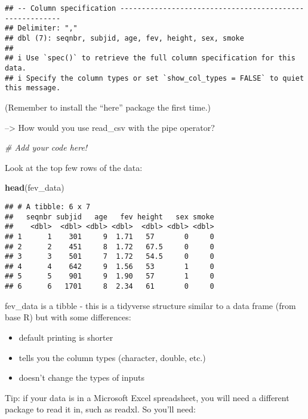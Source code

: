 \documentclass[
]{article}
\newenvironment{Shaded}{\begin{snugshade}}{\end{snugshade}}
\newcommand{\CommentTok}[1]{\textcolor[rgb]{0.56,0.35,0.01}{\textit{#1}}}
\newcommand{\FunctionTok}[1]{\textcolor[rgb]{0.13,0.29,0.53}{\textbf{#1}}}
\newcommand{\NormalTok}[1]{#1}
\providecommand{\tightlist}{%
  \setlength{\itemsep}{0pt}\setlength{\parskip}{0pt}}
\begin{document}
\begin{verbatim}
## -- Column specification --------------------------------------------------------
## Delimiter: ","
## dbl (7): seqnbr, subjid, age, fev, height, sex, smoke
## 
## i Use `spec()` to retrieve the full column specification for this data.
## i Specify the column types or set `show_col_types = FALSE` to quiet this message.
\end{verbatim}

(Remember to install the ``here'' package the first time.)

--\textgreater{} How would you use read\_csv with the pipe operator?

\begin{Shaded}
\begin{Highlighting}[]
\CommentTok{\# Add your code here!}
\end{Highlighting}
\end{Shaded}

Look at the top few rows of the data:

\begin{Shaded}
\begin{Highlighting}[]
\FunctionTok{head}\NormalTok{(fev\_data)}
\end{Highlighting}
\end{Shaded}

\begin{verbatim}
## # A tibble: 6 x 7
##   seqnbr subjid   age   fev height   sex smoke
##    <dbl>  <dbl> <dbl> <dbl>  <dbl> <dbl> <dbl>
## 1      1    301     9  1.71   57       0     0
## 2      2    451     8  1.72   67.5     0     0
## 3      3    501     7  1.72   54.5     0     0
## 4      4    642     9  1.56   53       1     0
## 5      5    901     9  1.90   57       1     0
## 6      6   1701     8  2.34   61       0     0
\end{verbatim}

fev\_data is a tibble - this is a tidyverse structure similar to a data
frame (from base R) but with some differences:

\begin{itemize}
\tightlist
\item
  default printing is shorter
\item
  tells you the column types (character, double, etc.)
\item
  doesn't change the types of inputs
\end{itemize}

Tip: if your data is in a Microsoft Excel spreadsheet, you will need a
different package to read it in, such as readxl. So you'll need:
\end{document}
